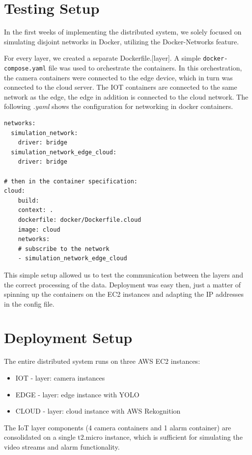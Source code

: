 \documentclass[conference]{IEEEtran}
\begin{document}
\section{Testing Setup}
In the first weeks of implementing the distributed system, we solely focused on simulating disjoint networks in Docker, utilizing the Docker-Networks feature. 

For every layer, we created a separate Dockerfile.[layer]. A simple \texttt{docker-compose.yaml} file was used to orchestrate the containers. In this orchestration, the camera containers were connected to the edge device, which in turn was connected to the cloud server. 
The IOT containers are connected to the same network as the edge, the edge in addition is connected to the cloud network. 
The following \textit{.yaml} shows the configuration for networking in docker containers.

\begin{verbatim}
networks:
  simulation_network:
    driver: bridge
  simulation_network_edge_cloud:
    driver: bridge

# then in the container specification: 
cloud: 
    build:
    context: .
    dockerfile: docker/Dockerfile.cloud
    image: cloud
    networks:
    # subscribe to the network
    - simulation_network_edge_cloud 
\end{verbatim}

This simple setup allowed us to test the communication between the layers and the correct processing of the data. 
Deployment was easy then, just a matter of spinning up the containers on the EC2 instances and adapting the IP addresses in the config file.

\section{Deployment Setup}
The entire distributed system runs on three AWS EC2 instances:
\begin{itemize}
    \item IOT - layer: camera instances
    \item EDGE - layer: edge instance with YOLO
    \item CLOUD - layer: cloud instance with AWS Rekognition
\end{itemize}

\hfill \break

The IoT layer components (4 camera containers and 1 alarm container) are consolidated on a single t2.micro instance, which is sufficient for simulating the video streams and alarm functionality.
\end{document}
